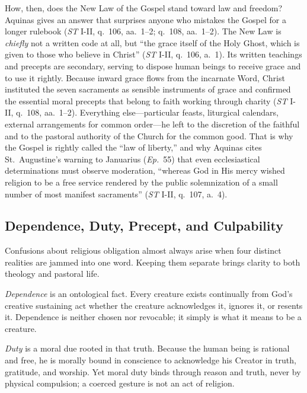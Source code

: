 How, then, does the New Law of the Gospel stand toward law and freedom? Aquinas gives an answer that surprises anyone who mistakes the Gospel for a longer rulebook (\emph{ST} I-II, q.\ 106, aa.\ 1--2; q.\ 108, aa.\ 1--2). The New Law is \emph{chiefly} not a written code at all, but ``the grace itself of the Holy Ghost, which is given to those who believe in Christ'' (\emph{ST} I-II, q.\ 106, a.\ 1). Its written teachings and precepts are secondary, serving to dispose human beings to receive grace and to use it rightly. Because inward grace flows from the incarnate Word, Christ instituted the seven sacraments as sensible instruments of grace and confirmed the essential moral precepts that belong to faith working through charity (\emph{ST} I-II, q.\ 108, aa.\ 1--2). Everything else---particular feasts, liturgical calendars, external arrangements for common order---he left to the discretion of the faithful and to the pastoral authority of the Church for the common good. That is why the Gospel is rightly called the ``law of liberty,'' and why Aquinas cites St.\ Augustine's warning to Januarius (\emph{Ep.}\ 55) that even ecclesiastical determinations must observe moderation, ``whereas God in His mercy wished religion to be a free service rendered by the public solemnization of a small number of most manifest sacraments'' (\emph{ST} I-II, q.\ 107, a.\ 4).

\subsection{Dependence, Duty, Precept, and Culpability}

Confusions about religious obligation almost always arise when four distinct realities are jammed into one word. Keeping them separate brings clarity to both theology and pastoral life.

\emph{Dependence} is an ontological fact. Every creature exists continually from God's creative sustaining act whether the creature acknowledges it, ignores it, or resents it. Dependence is neither chosen nor revocable; it simply is what it means to be a creature.

\emph{Duty} is a moral due rooted in that truth. Because the human being is rational and free, he is morally bound in conscience to acknowledge his Creator in truth, gratitude, and worship. Yet moral duty binds through reason and truth, never by physical compulsion; a coerced gesture is not an act of religion.

